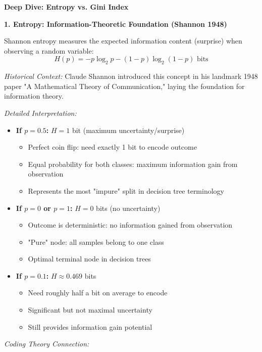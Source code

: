 \documentclass[12pt]{article}
\begin{document}
\begin{explanation}
\textbf{Deep Dive: Entropy vs. Gini Index}

\textbf{1. Entropy: Information-Theoretic Foundation (Shannon 1948)}

Shannon entropy measures the expected information content (surprise) when observing a random variable:
\[
H(p) = -p\log_2 p - (1-p)\log_2(1-p) \text{ bits}
\]

\textit{Historical Context:} Claude Shannon introduced this concept in his landmark 1948 paper "A Mathematical Theory of Communication," laying the foundation for information theory.

\textit{Detailed Interpretation:}
\begin{itemize}
    \item \textbf{If $p=0.5$:} $H = 1$ bit (maximum uncertainty/surprise)
    \begin{itemize}
        \item Perfect coin flip: need exactly 1 bit to encode outcome
        \item Equal probability for both classes: maximum information gain from observation
        \item Represents the most "impure" split in decision tree terminology
    \end{itemize}

    \item \textbf{If $p=0$ or $p=1$:} $H = 0$ bits (no uncertainty)
    \begin{itemize}
        \item Outcome is deterministic: no information gained from observation
        \item "Pure" node: all samples belong to one class
        \item Optimal terminal node in decision trees
    \end{itemize}

    \item \textbf{If $p=0.1$:} $H \approx 0.469$ bits
    \begin{itemize}
        \item Need roughly half a bit on average to encode
        \item Significant but not maximal uncertainty
        \item Still provides information gain potential
    \end{itemize}
\end{itemize}

\textit{Coding Theory Connection:}


\end{explanation}
\end{document}
